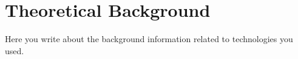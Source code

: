 \chapter{Theoretical Background}
Here you write about the background information related to technologies you used.